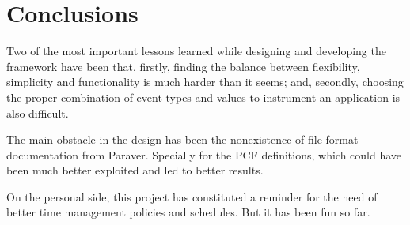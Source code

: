 \section{Conclusions}
\label{sec:conclusions}

Two of the most important lessons learned while designing and developing the
framework have been that, firstly, finding the balance between flexibility,
simplicity and functionality is much harder than it seems; and, secondly,
choosing the proper combination of event types and values to instrument an
application is also difficult.

The main obstacle in the design has been the nonexistence of file format
documentation from Paraver.  Specially for the PCF definitions, which could have
been much better exploited and led to better results.

On the personal side, this project has constituted a reminder for the need of
better time management policies and schedules.  But it has been fun so far.

